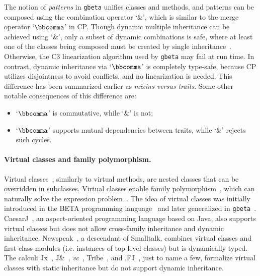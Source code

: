 The notion of \emph{patterns} in \texttt{gbeta} unifies classes and methods, and
patterns can be composed using the combination operator `\&', which is similar
to the merge operator `$\bbcomma$' in CP. Though dynamic multiple inheritance
can be achieved using `\&', only a subset of dynamic combinations is safe, where
at least one of the classes being composed must be created by single
inheritance~\citep{ernst2002safe}. Otherwise, the C3 linearization algorithm
used by \texttt{gbeta} may fail at run time. In contrast, dynamic inheritance
via `$\bbcomma$' is completely type-safe, because CP utilizes disjointness to
avoid conflicts, and no linearization is needed. This difference has been
summarized earlier as \emph{mixins versus traits}. Some other notable
consequences of this difference are:
\begin{itemize}
\item `$\bbcomma$' is commutative, while `\&' is not;
\item `$\bbcomma$' supports mutual dependencies between traits, while `\&'
rejects such cycles.
\end{itemize}

\paragraph{Virtual classes and family polymorphism.}
Virtual classes~\citep{madsen1989virtual}, similarly to virtual methods, are
nested classes that can be overridden in subclasses. Virtual classes enable
family polymorphism~\citep{ernst2001family}, which can naturally solve the
expression problem~\citep{ernst2004expression}. The idea of virtual classes was
initially introduced in the BETA programming language~\citep{madsen1993object}
and later generalized in \texttt{gbeta}~\citep{ernst2000gbeta}.
CaesarJ~\citep{aracic2006overview}, an aspect-oriented programming language
based on Java, also supports virtual classes but does not allow cross-family
inheritance and dynamic inheritance. Newspeak~\citep{bracha2010modules}, a
descendant of Smalltalk, combines virtual classes and first-class modules (i.e.
instances of top-level classes) but is dynamically typed. The calculi
Jx~\citep{nystrom2004scalable}, J\&~\citep{nystrom2006j},
\emph{vc}~\citep{ernst2006virtual}, Tribe~\citep{clarke2007tribe}, and
.FJ~\citep{saito2008lightweight}, just to name a few, formalize virtual classes
with static inheritance but do not support dynamic inheritance.

